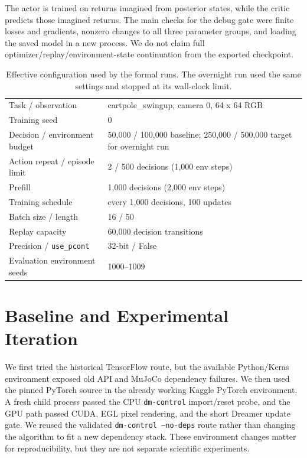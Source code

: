 \documentclass{article}
\begin{document}
The actor is trained on returns imagined from posterior states, while the critic predicts those imagined returns. The main checks for the debug gate were finite losses and gradients, nonzero changes to all three parameter groups, and loading the saved model in a new process. We do not claim full optimizer/replay/environment-state continuation from the exported checkpoint.

\begin{table}[t]
\caption{Effective configuration used by the formal runs. The overnight run used the same settings and stopped at its wall-clock limit.}
\centering\small
\begin{tabular}{ll}
\toprule
Task / observation & cartpole\_swingup, camera 0, 64 x 64 RGB \\
Training seed & 0 \\
Decision / environment budget & 50,000 / 100,000 baseline; 250,000 / 500,000 target for overnight run \\
Action repeat / episode limit & 2 / 500 decisions (1,000 env steps) \\
Prefill & 1,000 decisions (2,000 env steps) \\
Training schedule & every 1,000 decisions, 100 updates \\
Batch size / length & 16 / 50 \\
Replay capacity & 60,000 decision transitions \\
Precision / \texttt{use\_pcont} & 32-bit / False \\
Evaluation environment seeds & 1000--1009 \\
\bottomrule
\end{tabular}
\end{table}

\section{Baseline and Experimental Iteration}

We first tried the historical TensorFlow route, but the available Python/Keras environment exposed old API and MuJoCo dependency failures. We then used the pinned PyTorch source in the already working Kaggle PyTorch environment. A fresh child process passed the CPU \texttt{dm-control} import/reset probe, and the GPU path passed CUDA, EGL pixel rendering, and the short Dreamer update gate. We reused the validated \texttt{dm-control --no-deps} route rather than changing the algorithm to fit a new dependency stack. These environment changes matter for reproducibility, but they are not separate scientific experiments.
\end{document}

